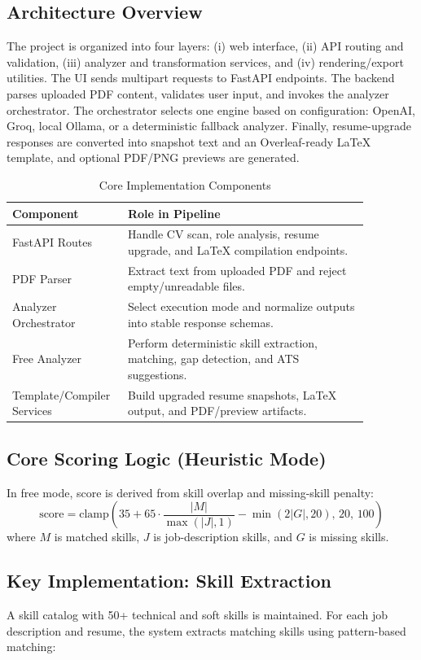 \documentclass[conference]{IEEEtran}
\begin{document}
\subsection{Architecture Overview}
The project is organized into four layers: (i) web interface, (ii) API routing and validation, (iii) analyzer and transformation services, and (iv) rendering/export utilities. The UI sends multipart requests to FastAPI endpoints. The backend parses uploaded PDF content, validates user input, and invokes the analyzer orchestrator. The orchestrator selects one engine based on configuration: OpenAI, Groq, local Ollama, or a deterministic fallback analyzer. Finally, resume-upgrade responses are converted into snapshot text and an Overleaf-ready LaTeX template, and optional PDF/PNG previews are generated.

\begin{table}[htbp]
\caption{Core Implementation Components}
\label{tab:components}
\centering
\footnotesize
\begin{tabular}{p{0.24\linewidth} p{0.63\linewidth}}
\toprule
\textbf{Component} & \textbf{Role in Pipeline} \\
\midrule
FastAPI Routes & Handle CV scan, role analysis, resume upgrade, and LaTeX compilation endpoints. \\
PDF Parser & Extract text from uploaded PDF and reject empty/unreadable files. \\
Analyzer Orchestrator & Select execution mode and normalize outputs into stable response schemas. \\
Free Analyzer & Perform deterministic skill extraction, matching, gap detection, and ATS suggestions. \\
Template/Compiler Services & Build upgraded resume snapshots, LaTeX output, and PDF/preview artifacts. \\
\bottomrule
\end{tabular}
\end{table}

\subsection{Core Scoring Logic (Heuristic Mode)}
In free mode, score is derived from skill overlap and missing-skill penalty:
\[
\text{score} = \text{clamp}\left(35 + 65\cdot\frac{|M|}{\max(|J|,1)} - \min(2|G|,20),\,20,\,100\right)
\]
where $M$ is matched skills, $J$ is job-description skills, and $G$ is missing skills.

\subsection{Key Implementation: Skill Extraction}
A skill catalog with 50+ technical and soft skills is maintained. For each job description and resume, the system extracts matching skills using pattern-based matching:
\end{document}
